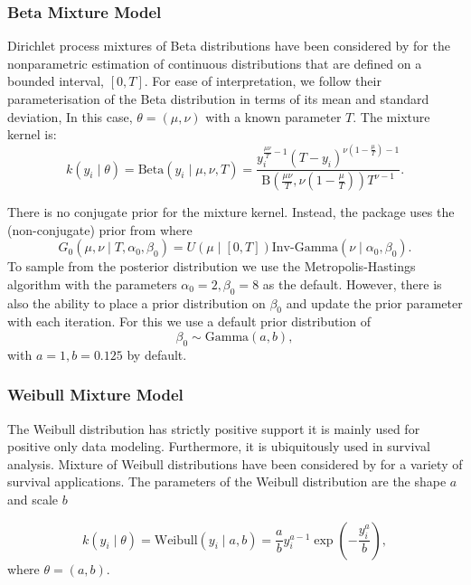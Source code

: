 \documentclass[nojss]{jss}
\begin{document}
\subsubsection{Beta Mixture Model}
Dirichlet process mixtures of Beta distributions have been considered by \cite{kottas_dirichlet_2006} for the nonparametric estimation of continuous distributions that are defined on a bounded interval, $\left[0, T \right]$. For ease of interpretation, we follow their parameterisation of the Beta distribution in terms of its mean and standard deviation, In this case, $\theta = (\mu,\nu)$ with a known parameter $T$. The mixture kernel is:
\begin{equation*}
k(y_i \mid \theta) = \text{Beta} (y_i \mid \mu, \nu, T) = \frac{y_i^{\frac{\mu \nu}{T} - 1} (T-y_i)^{\nu (1- \frac{\mu}{T})-1}}{\text{B}(\frac{\mu \nu}{T}, \nu(1-\frac{\mu}{T})) T^{\nu -1}}.
\end{equation*}

There is no conjugate prior for the mixture kernel. Instead, the  package uses the (non-conjugate) prior from \cite{kottas_dirichlet_2006} where
\begin{equation*}
G_0 (\mu , \nu \mid T, \alpha _0 , \beta _0) = U(\mu \mid [0, T]) \text{Inv-Gamma} (\nu \mid \alpha _0, \beta _0).
\end{equation*}
To sample from the posterior distribution we use the Metropolis-Hastings algorithm with the parameters $\alpha _0 = 2, \beta _0 =8$ as the default. However, there is also the ability to place a prior distribution on $\beta _0$ and update the prior parameter with each iteration. For this we use a default prior distribution of
\begin{equation*}
\beta _0 \sim \text{Gamma} (a, b),
\end{equation*}
with $a=1, b=0.125$ by default.

\subsubsection{Weibull Mixture Model}
The Weibull distribution has strictly positive support it is mainly used for positive only data modeling. Furthermore, it is ubiquitously used in survival analysis. Mixture of Weibull distributions have been considered by \cite{kottas_dirichlet_2006} for a variety of survival applications.
The parameters of the Weibull distribution are the shape $a$ and scale $b$

\begin{equation}
k(y_i \mid \theta) = \text{Weibull} (y_i \mid a, b) = \frac{a}{b} y_i ^{a-1}  \exp \left( -  \frac{y_i^a}{b}  \right),
\end{equation}
where $\theta = ( a, b )$.
\end{document}

